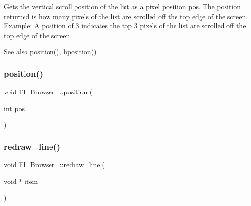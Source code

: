 Gets the vertical scroll position of the list as a pixel position {\ttfamily pos}. The position returned is how many pixels of the list are scrolled off the top edge of the screen. Example\+: A position of \textquotesingle{}3\textquotesingle{} indicates the top 3 pixels of the list are scrolled off the top edge of the screen. \begin{DoxySeeAlso}{See also}
\hyperlink{class_fl___browser___aeaf7951678d13027e9b5ca73925bedad}{position()}, \hyperlink{class_fl___browser___ae312c07fc6eee01f42eae60c85594889}{hposition()} 
\end{DoxySeeAlso}
\mbox{\label{class_fl___browser___ac88a0e4dc3feb727efc225a3f4f920be}} 
\subsubsection{\texorpdfstring{position()}{position()}\hspace{0.1cm}{\footnotesize\ttfamily [2/2]}}
{\footnotesize\ttfamily void Fl\+\_\+\+Browser\+\_\+\+::position (\begin{DoxyParamCaption}\item[{int}]{pos }\end{DoxyParamCaption})}

\mbox{\label{class_fl___browser___ac06f58d6aa13a432825231c19aba6544}} 
\subsubsection{\texorpdfstring{redraw\+\_\+line()}{redraw\_line()}}
{\footnotesize\ttfamily void Fl\+\_\+\+Browser\+\_\+\+::redraw\+\_\+line (\begin{DoxyParamCaption}\item[{void $\ast$}]{item }\end{DoxyParamCaption})\hspace{0.3cm}{\ttfamily [protected]}}

\mbox{\label{class_fl___browser___a78e2b46f393546abbe22ec28e048f8de}} 
